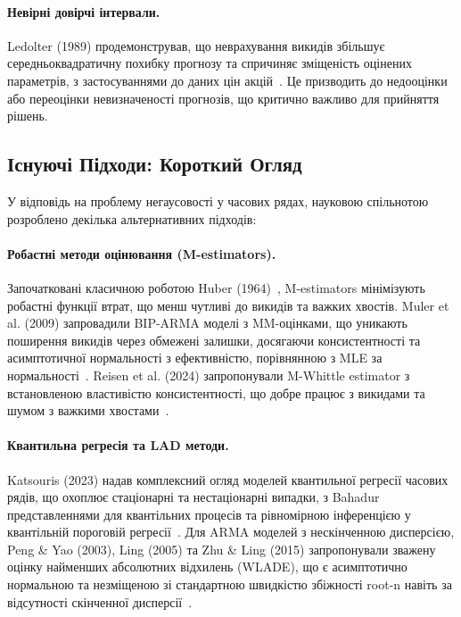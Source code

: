 \documentclass[12pt,a4paper]{article}
\begin{document}
\paragraph{Невірні довірчі інтервали.} Ledolter (1989) продемонстрував, що неврахування викидів збільшує середньоквадратичну похибку прогнозу та спричиняє зміщеність оцінених параметрів, з застосуваннями до даних цін акцій~\cite{ledolter1989inference}. Це призводить до недооцінки або переоцінки невизначеності прогнозів, що критично важливо для прийняття рішень.

\subsection{Існуючі Підходи: Короткий Огляд}
\label{subsec:existing_approaches}

У відповідь на проблему негаусовості у часових рядах, науковою спільнотою розроблено декілька альтернативних підходів:

\paragraph{Робастні методи оцінювання (M-estimators).} Започатковані класичною роботою Huber (1964)~\cite{huber1964robust}, M-estimators мінімізують робастні функції втрат, що менш чутливі до викидів та важких хвостів. Muler et al. (2009) запровадили BIP-ARMA моделі з MM-оцінками, що уникають поширення викидів через обмежені залишки, досягаючи консистентності та асимптотичної нормальності з ефективністю, порівнянною з MLE за нормальності~\cite{muler2009robust}. Reisen et al. (2024) запропонували M-Whittle estimator з встановленою властивістю консистентності, що добре працює з викидами та шумом з важкими хвостами~\cite{reisen2024robust}.

\paragraph{Квантильна регресія та LAD методи.} Katsouris (2023) надав комплексний огляд моделей квантильної регресії часових рядів, що охоплює стаціонарні та нестаціонарні випадки, з Bahadur представленнями для квантільних процесів та рівномірною інференцією у квантільній пороговій регресії~\cite{katsouris2023quantile}. Для ARMA моделей з нескінченною дисперсією, Peng \& Yao (2003), Ling (2005) та Zhu \& Ling (2015) запропонували зважену оцінку найменших абсолютних відхилень (WLADE), що є асимптотично нормальною та незміщеною зі стандартною швидкістю збіжності root-n навіть за відсутності скінченної дисперсії~\cite{peng2003least,ling2005self,zhu2015model}.
\end{document}
